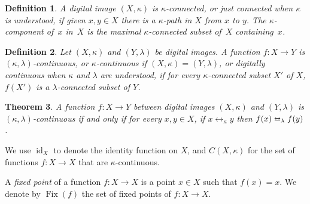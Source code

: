 \documentclass{article}
\newtheorem{thm}{Theorem}
\newtheorem{remarks}[thm]{Remark}
\newtheorem{definition}[thm]{Definition}
\numberwithin{thm}{section}
\newcommand{\adj}{\leftrightarrow}
\newcommand{\adjeq}{\leftrightarroweq}
\DeclareMathOperator{\id}{id}
\DeclareMathOperator{\Fix}{Fix}
\def\Z{{\mathbb Z}}
\begin{document}
\begin{definition}
{\rm \cite{Rosenfeld}}
A digital image $(X,\kappa)$ is
{\em $\kappa$-connected}, or just {\em connected} when
$\kappa$ is understood, if given $x,y \in X$ there
is a $\kappa$-path in $X$ from $x$ to $y$. The {\rm $\kappa$-component of~$x$ in~$X$} is the
maximal $\kappa$-connected subset
of~$X$ containing~$x$.
\end{definition}

\begin{definition}
{\rm \cite{Rosenfeld, Bx99}}
Let $(X,\kappa)$ and $(Y,\lambda)$ be digital
images. A function $f: X \to Y$ is 
{\em $(\kappa,\lambda)$-continuous}, or
{\em $\kappa$-continuous} if $(X,\kappa)=(Y,\lambda)$, or
{\em digitally continuous} when $\kappa$ and
$\lambda$ are understood, if for every
$\kappa$-connected subset $X'$ of $X$,
$f(X')$ is a $\lambda$-connected subset of $Y$.
\end{definition}

\begin{thm}
{\rm \cite{Bx99}}
A function $f: X \to Y$ between digital images
$(X,\kappa)$ and $(Y,\lambda)$ is
$(\kappa,\lambda)$-continuous if and only if for
every $x,y \in X$, if $x \adj_{\kappa} y$ then
$f(x) \adjeq_{\lambda} f(y)$.
\end{thm}

We use $\id_X$ to denote the identity function on $X$, 
and $C(X,\kappa)$ for the set of functions 
$f: X \to X$ that are $\kappa$-continuous.

A {\em fixed point} of a function $f: X \to X$ 
is a point $x \in X$ such that $f(x) = x$. We denote by
$\Fix(f)$ the set of fixed points of $f: X \to X$.
\end{document}
